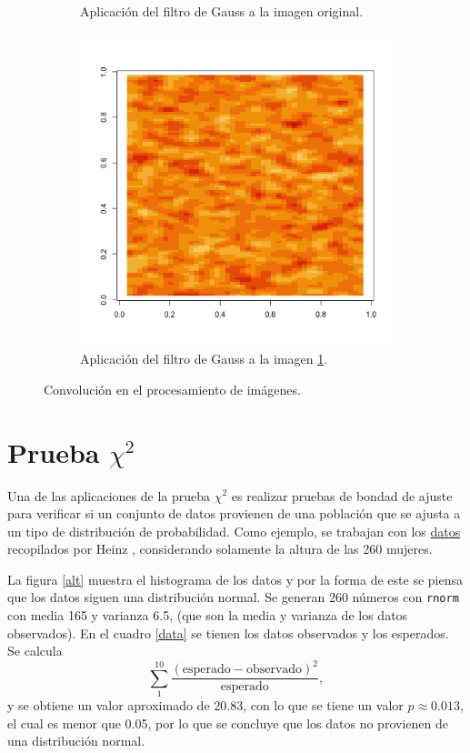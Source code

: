 \documentclass[12pt,letterpaper]{article}
\begin{document}
\begin{figure}
\begin{subfigure}[b]{0.3\linewidth}
 		\caption{Aplicación del filtro de Gauss a la imagen original.}
 		\label{2}
 	\end{subfigure} \hfill
 	 	\begin{subfigure}[b]{0.3\linewidth}
 		\includegraphics[width=\linewidth]{3.png} 		
 		\caption{Aplicación del filtro de Gauss a la imagen \ref{2}.}
 		\label{3}
 	\end{subfigure}
 	 	\caption{Convolución en el procesamiento de imágenes.} 
 	 		\label{im}
\end{figure}
\section{Prueba $\chi^2$}
Una de las aplicaciones de la prueba $\chi^2$ es realizar pruebas de bondad de ajuste para verificar si un conjunto de datos provienen de una población que se ajusta a un tipo de distribución de probabilidad. Como ejemplo, se trabajan con los  \href{http://jse.amstat.org/datasets/body.dat.txt}{datos} recopilados por Heinz \cite{datos}, considerando solamente la altura de las 260 mujeres.

La figura \ref{alt} muestra el histograma de los datos y por la forma de este se piensa que los datos siguen una distribución normal. Se generan 260 números con \texttt{rnorm} con media 165 y varianza 6.5, (que son la media y varianza de los datos observados). En el cuadro \ref{data} se tienen los datos observados y los esperados. Se calcula 
\begin{equation}
\sum_{1}^{10} \frac{(\text{esperado}-\text{observado})^2}{\text{esperado}}, 
\end{equation}
y se obtiene un valor aproximado de 20.83, con lo que se tiene un valor $p \approx 0.013 $, el cual es menor que 0.05, por lo que se concluye que los datos no provienen de una distribución normal.
\end{document}
